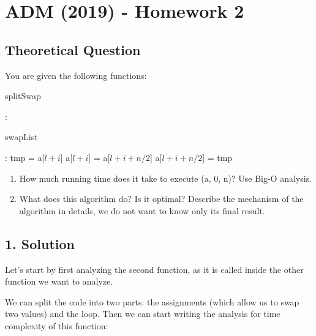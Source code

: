 \documentclass[12pt]{article}
\begin{document}
\section*{ADM (2019) - Homework 2}

\subsection*{Theoretical Question}
\vspace{.5cm}

You are given the following functions:
\vspace{.4cm}


\begin{algorithm}
\caption{splitSwap}\label{splitFun}
\begin{algorithmic}[1]
:
	\State \Return 
\EndIf

\State {}
\State {}
\State {}
\EndFunction
\end{algorithmic}
\end{algorithm}

\begin{algorithm}
\caption{swapList}\label{swapFun}
\begin{algorithmic}[1]
:
\State tmp = a[$l + i$]
\State a[$l + i$] = a[$l + i + n/2$]
\State a[$l + i + n/2$] = tmp
\EndFor
\EndFunction
\end{algorithmic}
\end{algorithm}

\begin{enumerate}
\item How much running time does it take to execute (a, 0, n)? Use Big-O analysis.
\item What does this algorithm do? Is it optimal? Describe the mechanism of the algorithm in details, we do not want to know only its final result.
\end{enumerate}
\pagebreak

\subsection*{1. Solution}

Let's start by first analyzing the second function,  as it is called inside the other function we want to 
analyze. 

We can split the code into two parts: the assignments (which allow us to swap two values) and the loop.
Then we can start writing the analysis for time complexity of this function: 
\end{document}
